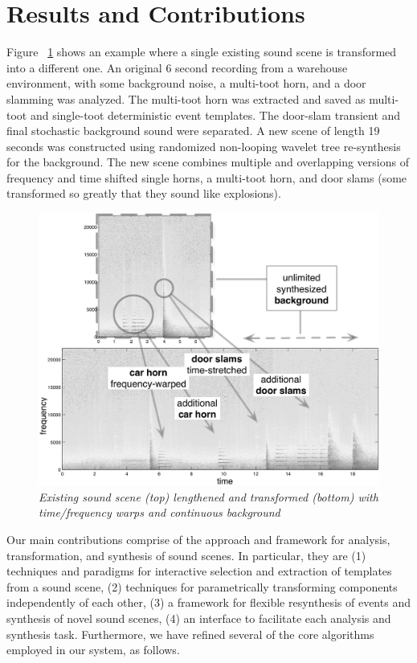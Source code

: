 \documentclass[twoside]{article}
\begin{document}
\section{Results and Contributions}

Figure ~\ref{fig:traffic} shows an example where a single 
existing sound scene is transformed into a different one. 
An original 6 second recording from a warehouse
environment, with some background noise, a multi-toot horn,
and a door slamming was analyzed. The multi-toot horn
was extracted and saved as multi-toot and single-toot deterministic event 
templates. The door-slam transient and final stochastic background sound were separated. 
A new scene of length 19 seconds was constructed using randomized non-looping wavelet
tree re-synthesis for the background. The
new scene combines multiple and overlapping versions
of frequency and time shifted single horns,
a multi-toot horn, and door slams (some transformed
so greatly that they sound like explosions). 

\begin{figure}[t]
\centering
\includegraphics[width=.95\columnwidth]{trafficb.jpg}
\caption{\it Existing sound scene (top) lengthened and transformed 
(bottom) with time/frequency 
warps and continuous background}
\label{fig:traffic}
\end{figure}
Our main contributions comprise of the approach and framework for analysis, transformation, 
and synthesis of sound scenes.  In particular, they are (1) techniques and paradigms for 
interactive selection and extraction of templates from a sound scene, (2) techniques for 
parametrically transforming components independently of each other, (3) a 
framework for flexible resynthesis of events and synthesis of novel sound scenes, (4) an 
interface to facilitate each analysis and synthesis task.  Furthermore, we 
have refined several of the core algorithms employed in our system, as follows.
\end{document}
